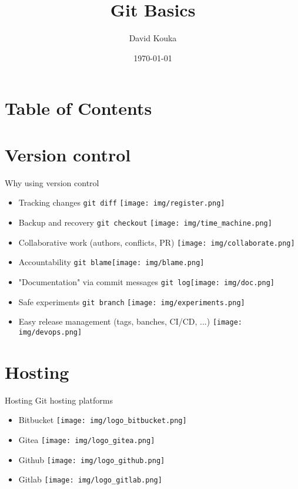 \documentclass{beamer}
\title{Git Basics}
\author{David Kouka}
\date{\today}
\begin{document}
\frame{\titlepage}

\section{Table of Contents}
\begin{frame}
    \tableofcontents
\end{frame}

\section{Version control}
\begin{frame}{Why using version control}
    \begin{itemize}
        \item<1-> Tracking changes \lstinline{git diff} \texttt{[image: img/register.png]}
        \item<2-> Backup and recovery \lstinline{git checkout} \texttt{[image: img/time\_machine.png]}

        \item<3-> Collaborative work (authors, conflicts, PR) \texttt{[image: img/collaborate.png]}

        \item<4-> Accountability \lstinline{git blame}\texttt{[image: img/blame.png]}

        \item<5-> "Documentation" via commit messages \lstinline{git log}\texttt{[image: img/doc.png]}

        \item<6-> Safe experiments \lstinline{git branch} \texttt{[image: img/experiments.png]}

        \item<7-> Easy release management (tags, banches, CI/CD, ...) \texttt{[image: img/devops.png]}

    \end{itemize}
\end{frame}

\section{Hosting}
\begin{frame}{Hosting}
     Git hosting platforms
    \begin{itemize}
        \item<2-> Bitbucket \texttt{[image: img/logo\_bitbucket.png]}
        \item<3-> Gitea \texttt{[image: img/logo\_gitea.png]}
        \item<4-> Github \texttt{[image: img/logo\_github.png]}
        \item<5-> Gitlab \texttt{[image: img/logo\_gitlab.png]}
    \end{itemize}
\end{frame}
\end{document}
